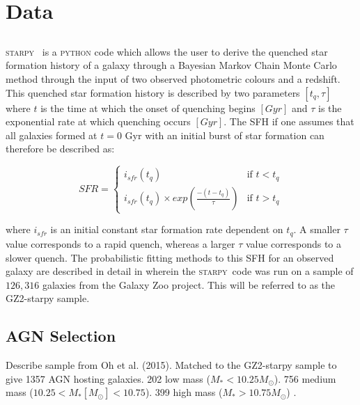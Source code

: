 \documentclass[useAMS,usenatbib]{mn2e}
\def\starpy {\textsc{starpy}}
\begin{document}
\section{Data}

\subsection{}

\starpy~ is a \textsc{python} code which allows the user to derive the quenched star formation history of a galaxy through a Bayesian Markov Chain Monte Carlo method through the input of two observed photometric colours and a redshift. This quenched star formation history is described by two parameters $[t_q, \tau]$ where $t$ is the time at which the onset of quenching begins $[Gyr]$ and $\tau$ is the exponential rate at which quenching occurs $[Gyr]$. The SFH if one assumes that all galaxies formed at $t=0$ Gyr with an initial burst of star formation can therefore be described as: 

\begin{equation}\label{sfh}
SFR =
\begin{cases}
i_{sfr}(t_q) & \text{if } t < t_q \\
i_{sfr}(t_q) \times exp{\left( \frac{-(t-t_{q})}{\tau}\right)} & \text{if } t > t_q 
\end{cases}
\end{equation}

where $i_{sfr}$ is an initial constant star formation rate dependent on $t_q$.  A smaller $\tau$ value corresponds to a rapid quench, whereas a larger $\tau$ value corresponds to a slower quench. The probabilistic fitting methods to this SFH for an observed galaxy are described in detail in \cite{Sme2015} wherein the \starpy ~code was run on a sample of $126,316$ galaxies from the Galaxy Zoo project. This will be referred to as the {\sc GZ2-starpy} sample. 

\subsection{AGN Selection}

Describe sample from Oh et al. (2015). Matched to the {\sc GZ2-starpy} sample to give 1357 AGN hosting galaxies. 202 low mass ($M_* < 10.25 M_{\odot}$). 756 medium mass  ($ 10.25 < M_* [M_{\odot}] < 10.75 $). 399 high mass ($M_* > 10.75 M_{\odot}$) . 

\end{document}
